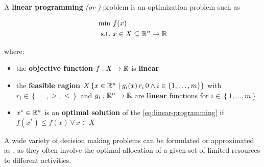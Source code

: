 \documentclass[english]{article}
\begin{document}
\bigskip
\begin{definition}
  A \textbf{linear programming} \textit{(or \LP)} problem is an optimization problem such as

  \begin{gather}
    \begin{aligned}
      \min \         & f(x)                                  \\
      \text{s.t.} \  & x \in X \subseteq \mathbb{R}^n \rightarrow \mathbb{R}
    \end{aligned}
    \label{eq:linear-programming}
  \end{gather}

  where:

  \begin{itemize}
    \item the \textbf{objective function} \(f: X \rightarrow \mathbb{R}\) is \textbf{linear}
    \item the \textbf{feasible ragion} \(X \left\{ x \in \mathbb{R}^n \mid   g_i(x) \, r_i \, 0 \land i \in \left\{ 1, \ldots, m \right\}\right\}\) with \(r_i \in \left\{ =, \geq, \leq \right\}\) and \(g_i: \mathbb{R}^n \rightarrow \mathbb{R}\) are \textbf{linear} functions for \(i \in \left\{ 1, \ldots, m \right\}\)
    \item \(x^\ast \in \mathbb{R}^n\) is an \textbf{optimal solution} of the \LP \ref{eq:linear-programming} if \(f(x^\ast) \leq f(x) \, \forall \, x \in X\)
  \end{itemize}
\end{definition}

\bigskip
A wide variety of decision making problems can be formulated or approximated as \LP, as they often involve the optimal allocation of a given set of limited resources to different activities.
\end{document}

